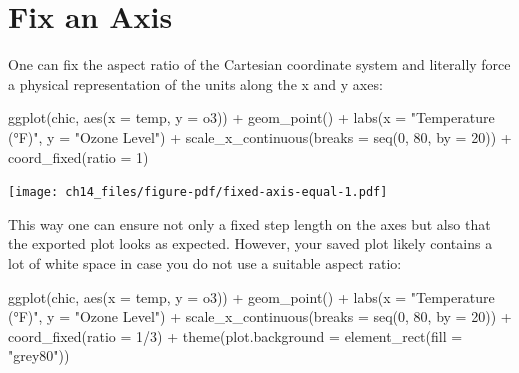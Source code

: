 \documentclass[
  letterpaper,
]{scrbook}
\newenvironment{Shaded}{\begin{snugshade}}{\end{snugshade}}
\newcommand{\AttributeTok}[1]{\textcolor[rgb]{0.40,0.45,0.13}{#1}}
\newcommand{\DecValTok}[1]{\textcolor[rgb]{0.68,0.00,0.00}{#1}}
\newcommand{\FunctionTok}[1]{\textcolor[rgb]{0.28,0.35,0.67}{#1}}
\newcommand{\NormalTok}[1]{\textcolor[rgb]{0.00,0.23,0.31}{#1}}
\newcommand{\SpecialCharTok}[1]{\textcolor[rgb]{0.37,0.37,0.37}{#1}}
\newcommand{\StringTok}[1]{\textcolor[rgb]{0.13,0.47,0.30}{#1}}
\begin{document}
\section{Fix an Axis}\label{fix-an-axis}

One can fix the aspect ratio of the Cartesian coordinate system and
literally force a physical representation of the units along the x and y
axes:

\begin{Shaded}
\begin{Highlighting}[]
\FunctionTok{ggplot}\NormalTok{(chic, }\FunctionTok{aes}\NormalTok{(}\AttributeTok{x =}\NormalTok{ temp, }\AttributeTok{y =}\NormalTok{ o3)) }\SpecialCharTok{+}
  \FunctionTok{geom\_point}\NormalTok{() }\SpecialCharTok{+}
  \FunctionTok{labs}\NormalTok{(}\AttributeTok{x =} \StringTok{"Temperature (°F)"}\NormalTok{, }\AttributeTok{y =} \StringTok{"Ozone Level"}\NormalTok{) }\SpecialCharTok{+}
  \FunctionTok{scale\_x\_continuous}\NormalTok{(}\AttributeTok{breaks =} \FunctionTok{seq}\NormalTok{(}\DecValTok{0}\NormalTok{, }\DecValTok{80}\NormalTok{, }\AttributeTok{by =} \DecValTok{20}\NormalTok{)) }\SpecialCharTok{+}
  \FunctionTok{coord\_fixed}\NormalTok{(}\AttributeTok{ratio =} \DecValTok{1}\NormalTok{)}
\end{Highlighting}
\end{Shaded}

\texttt{[image: ch14\_files/figure-pdf/fixed-axis-equal-1.pdf]}

This way one can ensure not only a fixed step length on the axes but
also that the exported plot looks as expected. However, your saved plot
likely contains a lot of white space in case you do not use a suitable
aspect ratio:

\begin{Shaded}
\begin{Highlighting}[]
\FunctionTok{ggplot}\NormalTok{(chic, }\FunctionTok{aes}\NormalTok{(}\AttributeTok{x =}\NormalTok{ temp, }\AttributeTok{y =}\NormalTok{ o3)) }\SpecialCharTok{+}
  \FunctionTok{geom\_point}\NormalTok{() }\SpecialCharTok{+}
  \FunctionTok{labs}\NormalTok{(}\AttributeTok{x =} \StringTok{"Temperature (°F)"}\NormalTok{, }\AttributeTok{y =} \StringTok{"Ozone Level"}\NormalTok{) }\SpecialCharTok{+}
  \FunctionTok{scale\_x\_continuous}\NormalTok{(}\AttributeTok{breaks =} \FunctionTok{seq}\NormalTok{(}\DecValTok{0}\NormalTok{, }\DecValTok{80}\NormalTok{, }\AttributeTok{by =} \DecValTok{20}\NormalTok{)) }\SpecialCharTok{+}
  \FunctionTok{coord\_fixed}\NormalTok{(}\AttributeTok{ratio =} \DecValTok{1}\SpecialCharTok{/}\DecValTok{3}\NormalTok{) }\SpecialCharTok{+}
  \FunctionTok{theme}\NormalTok{(}\AttributeTok{plot.background =} \FunctionTok{element\_rect}\NormalTok{(}\AttributeTok{fill =} \StringTok{"grey80"}\NormalTok{))}
\end{Highlighting}
\end{Shaded}
\end{document}
